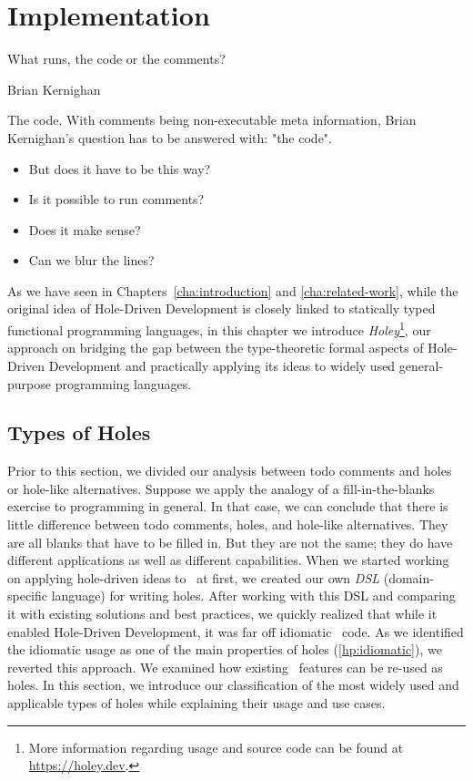 \chapter{Implementation}
\label{cha:implementation}
\epigraph{What runs, the code or the comments?}{Brian Kernighan}

\noindent
The code.
With comments being non-executable meta information, Brian Kernighan's question has to be answered with: "the code".
\begin{itemize}
    \item But does it have to be this way?
    \item Is it possible to run comments?
    \item Does it make sense?
    \item Can we blur the lines?
\end{itemize}
As we have seen in Chapters~\ref{cha:introduction} and \ref{cha:related-work}, while the original idea of Hole-Driven Development is closely linked to statically typed functional programming languages, in this chapter we introduce \emph{Holey}\footnote{More information regarding usage and source code can be found at \url{https://holey.dev}.}, our approach on bridging the gap between the type-theoretic formal aspects of Hole-Driven Development and practically applying its ideas to widely used general-purpose programming languages.

\section{Types of Holes}
\label{sec:holey-types-of-holes}
Prior to this section, we divided our analysis between todo comments and holes or hole-like alternatives.
Suppose we apply the analogy of a fill-in-the-blanks exercise to programming in general.
In that case, we can conclude that there is little difference between todo comments, holes, and hole-like alternatives.
They are all blanks that have to be filled in.
But they are not the same; they do have different applications as well as different capabilities.
When we started working on applying hole-driven ideas to \CS\ at first, we created our own \emph{DSL} (domain-specific language) for writing holes.
After working with this DSL and comparing it with existing solutions and best practices, we quickly realized that while it enabled Hole-Driven Development, it was far off idiomatic \CS\ code.
As we identified the idiomatic usage as one of the main properties of holes (\ref{hp:idiomatic}), we reverted this approach.
We examined how existing \CS\ features can be re-used as holes.
In this section, we introduce our classification of the most widely used and applicable types of holes while explaining their usage and use cases. 


